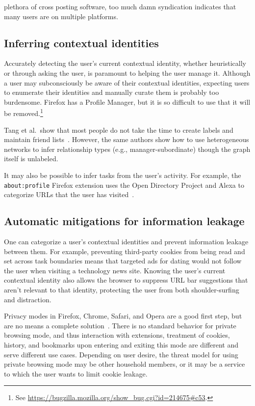 \documentclass[10pt, conference, compsocconf]{IEEEtran}
\begin{document}
plethora of cross posting software, too much damn syndication indicates that
many users are on multiple platforms.

\subsection{Inferring contextual identities}
Accurately detecting the user's current contextual identity, whether
heuristically or through asking the user, is paramount to helping the user
manage it.  Although a user may subconsciously be aware of their contextual
identities, expecting users to enumerate their identities and manually curate
them is probably too burdensome. Firefox has a Profile Manager, but it is so
difficult to use that it will be removed.\footnote{See
\url{https://bugzilla.mozilla.org/show\_bug.cgi?id=214675\#c53}.}

Tang et al.~show that most people do not take the time to create labels and
maintain friend lists~\cite{tang}. However, the same authors show how to use
heterogeneous networks to infer relationship types (e.g., manager-subordinate)
though the graph itself is unlabeled.

It may also be possible to infer tasks from the user's activity. For example,
the \texttt{about:profile} Firefox extension uses the Open Directory Project
and Alexa to categorize URLs that the user has visited~\cite{aboutprofile}.

\subsection{Automatic mitigations for information leakage}
One can categorize a user's contextual identities and prevent information
leakage between them.  For example, preventing third-party cookies from being
read and set across task boundaries means that targeted ads for dating would
not follow the user when visiting a technology news site. Knowing the user's
current contextual identity also allows the browser to suppress URL bar
suggestions that aren't relevant to that identity, protecting the user from
both shoulder-surfing and distraction.

Privacy modes in Firefox, Chrome, Safari, and Opera are a good first step, but
are no means a complete solution~\cite{ABBJ10}. There is no standard behavior
for private browsing mode, and thus interaction with extensions, treatment of
cookies, history, and bookmarks upon entering and exiting this mode are
different and serve different use cases. Depending on user desire, the threat
model for using private browsing mode may be other household members, or it may
be a service to which the user wants to limit cookie leakage.
\end{document}
